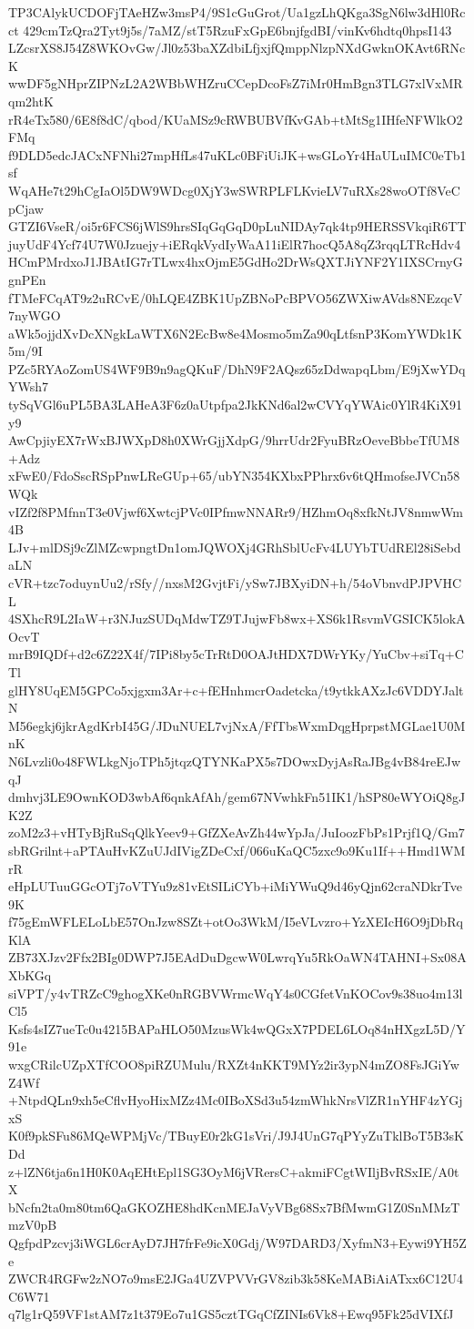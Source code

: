 TP3CAlykUCDOFjTAeHZw3msP4/9S1cGuGrot/Ua1gzLhQKga3SgN6lw3dHl0Rcct
429cmTzQra2Tyt9j5s/7aMZ/stT5RzuFxGpE6bnjfgdBI/vinKv6hdtq0hpsI143
LZcsrXS8J54Z8WKOvGw/Jl0z53baXZdbiLfjxjfQmppNlzpNXdGwknOKAvt6RNcK
wwDF5gNHprZIPNzL2A2WBbWHZruCCepDcoFsZ7iMr0HmBgn3TLG7xlVxMRqm2htK
rR4eTx580/6E8f8dC/qbod/KUaMSz9cRWBUBVfKvGAb+tMtSg1IHfeNFWlkO2FMq
f9DLD5edcJACxNFNhi27mpHfLs47uKLc0BFiUiJK+wsGLoYr4HaULuIMC0eTb1sf
WqAHe7t29hCgIaOl5DW9WDcg0XjY3wSWRPLFLKvieLV7uRXs28woOTf8VeCpCjaw
GTZI6VseR/oi5r6FCS6jWlS9hrsSIqGqGqD0pLuNIDAy7qk4tp9HERSSVkqiR6TT
juyUdF4Ycf74U7W0Jzuejy+iERqkVydIyWaA11iElR7hocQ5A8qZ3rqqLTRcHdv4
HCmPMrdxoJ1JBAtIG7rTLwx4hxOjmE5GdHo2DrWsQXTJiYNF2Y1IXSCrnyGgnPEn
fTMeFCqAT9z2uRCvE/0hLQE4ZBK1UpZBNoPcBPVO56ZWXiwAVds8NEzqcV7nyWGO
aWk5ojjdXvDcXNgkLaWTX6N2EcBw8e4Mosmo5mZa90qLtfsnP3KomYWDk1K5m/9I
PZc5RYAoZomUS4WF9B9n9agQKuF/DhN9F2AQsz65zDdwapqLbm/E9jXwYDqYWsh7
tySqVGl6uPL5BA3LAHeA3F6z0aUtpfpa2JkKNd6al2wCVYqYWAic0YlR4KiX91y9
AwCpjiyEX7rWxBJWXpD8h0XWrGjjXdpG/9hrrUdr2FyuBRzOeveBbbeTfUM8+Adz
xFwE0/FdoSscRSpPnwLReGUp+65/ubYN354KXbxPPhrx6v6tQHmofseJVCn58WQk
vIZf2f8PMfnnT3e0Vjwf6XwtcjPVc0IPfmwNNARr9/HZhmOq8xfkNtJV8nmwWm4B
LJv+mlDSj9cZlMZcwpngtDn1omJQWOXj4GRhSblUcFv4LUYbTUdREl28iSebdaLN
cVR+tzc7oduynUu2/rSfy//nxsM2GvjtFi/ySw7JBXyiDN+h/54oVbnvdPJPVHCL
4SXhcR9L2IaW+r3NJuzSUDqMdwTZ9TJujwFb8wx+XS6k1RsvmVGSICK5lokAOcvT
mrB9IQDf+d2c6Z22X4f/7IPi8by5cTrRtD0OAJtHDX7DWrYKy/YuCbv+siTq+CTl
glHY8UqEM5GPCo5xjgxm3Ar+c+fEHnhmcrOadetcka/t9ytkkAXzJc6VDDYJaltN
M56egkj6jkrAgdKrbI45G/JDuNUEL7vjNxA/FfTbsWxmDqgHprpstMGLae1U0MnK
N6Lvzli0o48FWLkgNjoTPh5jtqzQTYNKaPX5s7DOwxDyjAsRaJBg4vB84reEJwqJ
dmhvj3LE9OwnKOD3wbAf6qnkAfAh/gem67NVwhkFn51IK1/hSP80eWYOiQ8gJK2Z
zoM2z3+vHTyBjRuSqQlkYeev9+GfZXeAvZh44wYpJa/JuIoozFbPs1Prjf1Q/Gm7
sbRGrilnt+aPTAuHvKZuUJdIVigZDeCxf/066uKaQC5zxc9o9Ku1If++Hmd1WMrR
eHpLUTuuGGcOTj7oVTYu9z81vEtSILiCYb+iMiYWuQ9d46yQjn62craNDkrTve9K
f75gEmWFLELoLbE57OnJzw8SZt+otOo3WkM/I5eVLvzro+YzXEIcH6O9jDbRqKlA
ZB73XJzv2Ffx2BIg0DWP7J5EAdDuDgcwW0LwrqYu5RkOaWN4TAHNI+Sx08AXbKGq
siVPT/y4vTRZcC9ghogXKe0nRGBVWrmcWqY4s0CGfetVnKOCov9s38uo4m13lCl5
Ksfs4sIZ7ueTc0u4215BAPaHLO50MzusWk4wQGxX7PDEL6LOq84nHXgzL5D/Y91e
wxgCRilcUZpXTfCOO8piRZUMulu/RXZt4nKKT9MYz2ir3ypN4mZO8FsJGiYwZ4Wf
+NtpdQLn9xh5eCflvHyoHixMZz4Mc0IBoXSd3u54zmWhkNrsVlZR1nYHF4zYGjxS
K0f9pkSFu86MQeWPMjVc/TBuyE0r2kG1sVri/J9J4UnG7qPYyZuTklBoT5B3sKDd
z+lZN6tja6n1H0K0AqEHtEpl1SG3OyM6jVRersC+akmiFCgtWIljBvRSxIE/A0tX
bNcfn2ta0m80tm6QaGKOZHE8hdKcnMEJaVyVBg68Sx7BfMwmG1Z0SnMMzTmzV0pB
QgfpdPzcvj3iWGL6crAyD7JH7frFe9icX0Gdj/W97DARD3/XyfmN3+Eywi9YH5Ze
ZWCR4RGFw2zNO7o9msE2JGa4UZVPVVrGV8zib3k58KeMABiAiATxx6C12U4C6W71
q7lg1rQ59VF1stAM7z1t379Eo7u1GS5cztTGqCfZINIs6Vk8+Ewq95Fk25dVIXfJ

